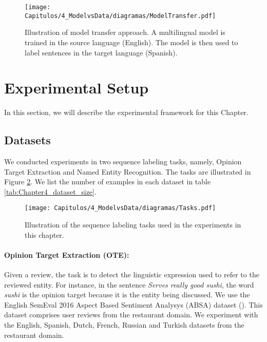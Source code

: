 \begin{figure}[htb]
    \centering
    \texttt{[image: Capitulos/4\_ModelvsData/diagramas/ModelTransfer.pdf]}
    \caption{Illustration of model transfer approach. A multilingual model is trained in the source language (English). The model is then used to label sentences in the target language (Spanish).}
    \label{fig:model_transfer}
\end{figure}


\section{Experimental Setup}
\label{sc4:experimental-setup}


In this section, we will describe the experimental framework for this Chapter. 

\subsection{Datasets}
\label{sec:chap4_datasets}

We conducted experiments in two sequence labeling tasks, namely, Opinion Target Extraction and Named Entity Recognition. The tasks are illustrated in Figure \ref{fig:chapter4_tasks}. 
We list the number of examples in each dataset in table \ref{tab:Chapter4_dataset_size}. 

\begin{figure}[htb]
    \centering
    \texttt{[image: Capitulos/4\_ModelvsData/diagramas/Tasks.pdf]}
    \caption{Illustration of the sequence labeling tasks used in the experiments in this chapter.}
    \label{fig:chapter4_tasks}
    \vspace{-0.5cm}
\end{figure}

\paragraph{Opinion Target Extraction (OTE):} Given a review, the task is to detect the linguistic expression used to refer to the reviewed entity. For instance, in the sentence \textit{Serves really good sushi}, the word \textit{sushi} is the opinion target because it is the entity being discussed. We use the English SemEval 2016 Aspect Based Sentiment Analysys (ABSA) dataset (\cite{pontiki-etal-2016-semeval}). This dataset comprises user reviews from the restaurant domain. We experiment with the English, Spanish, Dutch, French, Russian and Turkish datasets from the restaurant domain. 

